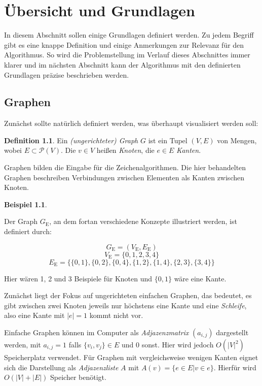 \documentclass[a4paper]{scrreprt}
\theoremstyle{definition}
\newtheorem{definition}[satz]{Definition}
\newtheorem{example}[satz]{Beispiel}
\begin{document}
\chapter{Übersicht und Grundlagen}
\label{chap:basics}

In diesem Abschnitt sollen einige Grundlagen definiert werden. Zu jedem Begriff gibt es eine knappe Definition und einige Anmerkungen zur Relevanz für den Algorithmus. So wird die Problemstellung im Verlauf dieses Abschnittes immer klarer und im nächsten Abschnitt kann der Algorithmus mit den definierten Grundlagen präzise beschrieben werden.

\section{Graphen}

Zunächst sollte natürlich definiert werden, was überhaupt visualisiert werden soll:

\begin{definition}
  Ein \emph{(ungerichteter) Graph} $G$ ist ein Tupel $(V, E)$ von Mengen, wobei $E \subset \mathcal{P}(V)$.
  Die $v \in V$ heißen \emph{Knoten}, die $e \in E$ \emph{Kanten}.
\end{definition}

Graphen bilden die Eingabe für die Zeichenalgorithmen. Die hier behandelten Graphen beschreiben Verbindungen zwischen Elementen als Kanten zwischen Knoten. 

\begin{example}
  \label{ex:graph}

Der Graph $G_\text{E}$, an dem fortan verschiedene Konzepte illustriert werden, ist definiert durch:

\[G_\text{E} = (V_\text{E}, E_\text{E})\]
\[V_\text{E} = \{0, 1, 2, 3, 4\}\]
\[E_\text{E} = \{\{0, 1\}, \{0, 2\}, \{0, 4\}, \{1, 2\}, \{1, 4\}, \{2, 3\}, \{3, 4\}\}\]

Hier wären 1, 2 und 3 Beispiele für Knoten und $\{0, 1\}$ wäre eine Kante.
\end{example}

Zunächst liegt der Fokus auf ungerichteten einfachen Graphen, das bedeutet, es gibt zwischen zwei Knoten jeweils nur höchstens eine Kante und eine \emph{Schleife}, also eine Kante mit $|e| = 1$ kommt nicht vor.

Einfache Graphen können im Computer als \emph{Adjazenzmatrix} $(a_{i,j})$ dargestellt werden, mit $a_{i,j} = 1$ falls $\{v_i, v_j\} \in E$ und $0$ sonst. Hier wird jedoch $O(|V|^2)$ Speicherplatz verwendet. Für Graphen mit vergleichsweise wenigen Kanten eignet sich die Darstellung als \emph{Adjazenzliste} $A$ mit $A(v) = \{e \in E | v \in e\}$. Hierfür wird $O(|V| + |E|)$ Speicher benötigt. %
\end{document}

